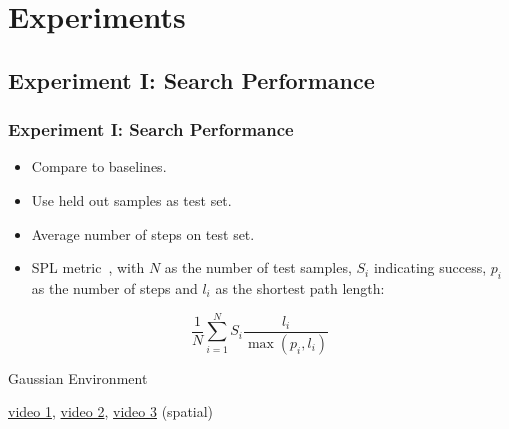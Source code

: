 \section{Experiments}

\subsection{Experiment I: Search Performance}

\begin{frame}
    \frametitle{Experiment I: Search Performance}

    \begin{itemize}
        \item Compare to baselines.
        \item Use held out samples as test set.
        \item Average number of steps on test set.
        \item SPL metric~\cite{anderson_evaluation_2018}, with \(N\) as the number of test samples, \(S_i\) indicating success, \(p_i\) as the number of steps and \(l_i\) as the shortest path length:
    \end{itemize}

    \begin{equation}
        \frac{1}{N} \sum_{i=1}^N S_i \frac{l_i}{\max(p_i,l_i)}
    \end{equation}
\end{frame}

\begin{frame}
    \begin{table}
        \centering
        Gaussian Environment\par\vspace{0.5em}
        
    \end{table}

    \begin{center}
        \href{run:videos/gaussian/map/0.gif}{video 1}, \href{run:videos/gaussian/map/0.gif}{video 2}, \href{run:videos/gaussian/map/2.gif}{video 3} (spatial)
    \end{center}
\end{frame}

